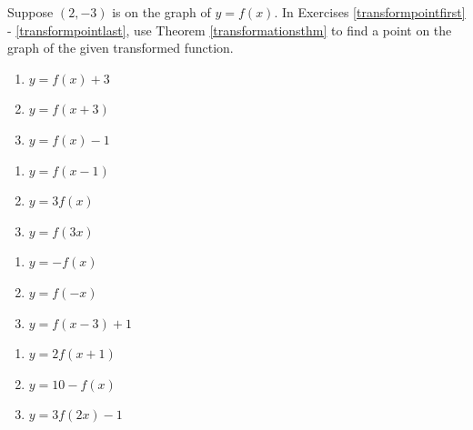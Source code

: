 Suppose $(2,-3)$ is on the graph of $y = f(x)$.  In Exercises \ref{transformpointfirst} - \ref{transformpointlast}, use Theorem \ref{transformationsthm} to find a point on the graph of the given transformed function.

\begin{multicols}{3}
\begin{enumerate}

\item $y = f(x)+3$ \label{transformpointfirst}
\item $y = f(x+3)$
\item $y = f(x)-1$

\setcounter{HW}{\value{enumi}}
\end{enumerate}
\end{multicols}

\begin{multicols}{3}
\begin{enumerate}
\setcounter{enumi}{\value{HW}}

\item $y = f(x-1)$
\item $y = 3f(x)$
\item $y = f(3x)$

\setcounter{HW}{\value{enumi}}
\end{enumerate}
\end{multicols}

\begin{multicols}{3}
\begin{enumerate}
\setcounter{enumi}{\value{HW}}

\item $y = -f(x)$
\item $y = f(-x)$
\item $y = f(x-3)+1$

\setcounter{HW}{\value{enumi}}
\end{enumerate}
\end{multicols}

\begin{multicols}{3}
\begin{enumerate}
\setcounter{enumi}{\value{HW}}

\item $y = 2f(x+1)$
\item $y = 10 - f(x)$
\item $y = 3f(2x) - 1$

\setcounter{HW}{\value{enumi}}
\end{enumerate}
\end{multicols}

